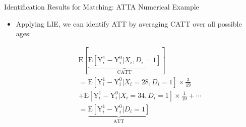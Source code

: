\documentclass[hyperref={pdfpagelabels=false}]{beamer}
\begin{document}
\begin{frame}{Identification Results for Matching: ATT}{A Numerical Example}
	\begin{itemize}
		
	
	\item Applying LIE, we can identify ATT by averaging CATT over all possible ages:
	\vspace{0.2cm}
	
	
	\begin{equation*}
		\begin{aligned}
			& \mathrm{E}[\underbrace{\mathrm{E}[\mathrm{Y}^{1}_{i}-\mathrm{Y}^{0}_{i}|X_{i}, D_{i}=1]}_{\text{CATT}}] \\
			&= \mathrm{E}[\mathrm{Y}^{1}_{i}-\mathrm{Y}^{0}_{i}|X_{i}=28, D_{i}=1] \times \frac{3}{19}  \\ 
			&  + \mathrm{E}[\mathrm{Y}^{1}_{i}-\mathrm{Y}^{0}_{i}|X_{i}=34, D_{i}=1] \times \frac{1}{19} + \cdots \\
			&=\underbrace{\mathrm{E}[\mathrm{Y}^{1}_{i}-\mathrm{Y}^{0}_{i}| D_{i}=1]}_{\text{ATT}}
			
		\end{aligned}
	\end{equation*}	
			\end{itemize}
\end{frame}
\end{document}
